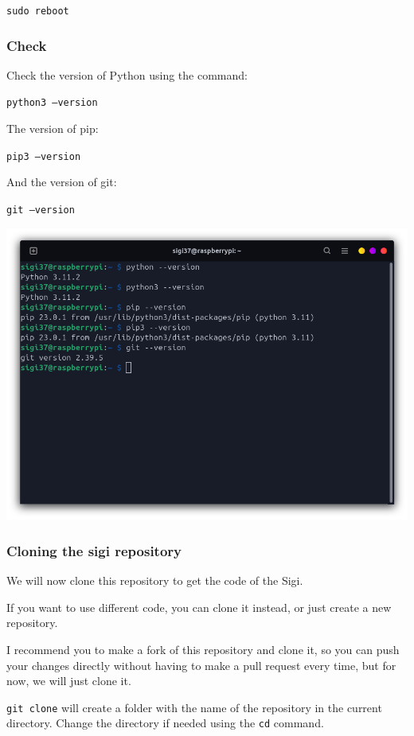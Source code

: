 \documentclass{article}
\begin{document}
\texttt{sudo reboot}

\subsubsection{Check}

Check the version of Python using the command:

\texttt{python3 --version}

The version of pip:

\texttt{pip3 --version}

And the version of git:

\texttt{git --version}

\includegraphics[scale=0.37]{img/all_versions.png}

\subsubsection{Cloning the sigi repository}

We will now clone this repository to get the code of the Sigi.

If you want to use different code, you can clone it instead, or just create a new repository.

I recommend you to make a fork of this repository and clone it, so you can push your changes
directly without having to make a pull request every time, but for now, we will just clone it.

\texttt{git clone} will create a folder with the name of the repository in the current directory.
Change the directory if needed using the \texttt{cd} command.
\end{document}
